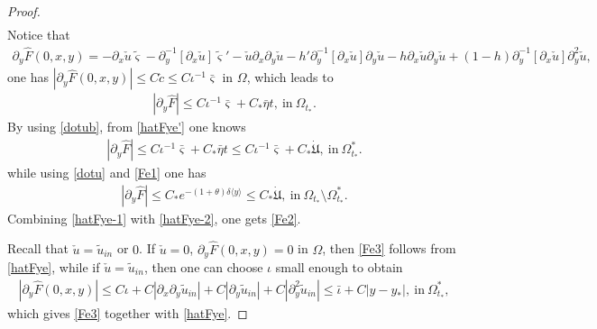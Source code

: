 \documentclass{amsart}
\numberwithin{equation}{section}
\newcommand\y{{{\langle y \rangle}}}
\begin{document}
\begin{proof}
\begin{align}
\end{align}
Notice that
\begin{align*}
\partial_{y}\hat{F}(0,x,y)
=-\partial_{x}\check{u}\tilde{\varsigma}
 -\partial_{y}^{-1}[\partial_{x}\check{u}]\tilde{\varsigma}'
 -\check{u}\partial_{x}\partial_{y}\check{u}
 -h'\partial_{y}^{-1}[\partial_{x}\check{u}]\partial_{y}\check{u}
 -h\partial_{x}\check{u}\partial_{y}\check{u}
 +(1-h)\partial_{y}^{-1}[\partial_{x}\check{u}]\partial_{y}^{2}\check{u},
\end{align*}
one has $|\partial_{y}\hat{F}(0,x,y)|\leq C\check{c}\leq C\iota^{-1}\bar{\varsigma}$ in $\Omega$, which leads to
\begin{align}\label{hatFye'}
|\partial_{y}\hat{F}|
\leq C\iota^{-1}\bar{\varsigma}+C_{*}\bar{\eta}t,~\text{in}~\Omega_{t_{*}}.
\end{align}
By using \eqref{dotub}, from \eqref{hatFye'} one knows
\begin{align}\label{hatFye-1}
|\partial_{y}\hat{F}|
\leq C\iota^{-1}\bar{\varsigma}+C_{*}\bar{\eta}t
\leq C\iota^{-1}\bar{\varsigma}+C_{*}\dot{\mathfrak{U}},~\text{in}~\Omega_{t_{*}}^{*}.
\end{align}
while using \eqref{dotu} and \eqref{Fe1} one has
\begin{align}\label{hatFye-2}
|\partial_{y}\hat{F}|
\leq C_{*}e^{-(1+\theta)\delta\y}
\leq C_{*}\dot{\mathfrak{U}},~\text{in}~\Omega_{t_{*}}\setminus\Omega_{t_{*}}^{*}.
\end{align}
Combining \eqref{hatFye-1} with \eqref{hatFye-2}, one gets \eqref{Fe2}.

Recall that $\check{u}=\tilde{u}_{in}$ or $0$. If $\check{u}=0$, $\partial_{y}\hat{F}(0,x,y)=0$ in $\Omega$, then \eqref{Fe3} follows from \eqref{hatFye}, while
if $\check{u}=\tilde{u}_{in}$, then one can choose $\iota$ small enough to obtain
\begin{align}
|\partial_{y}\hat{F}(0,x,y)|
\leq C\iota
    +C|\partial_{x}\partial_{y}\tilde{u}_{in}|
    +C|\partial_{y}\tilde{u}_{in}|
    +C|\partial_{y}^{2}\tilde{u}_{in}|
\leq \bar{\iota}+C|y-y_{*}|,~\text{in}~\Omega_{t_{*}}^{*},
\end{align}
which gives \eqref{Fe3} together with \eqref{hatFye}.



\end{proof}
\end{document}
